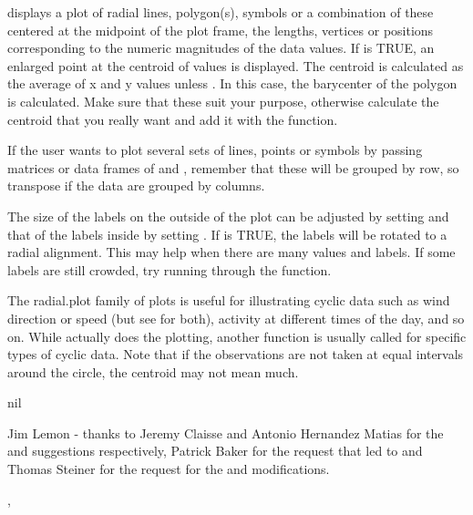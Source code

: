 \begin{Details}\relax
{} displays a plot of radial lines, polygon(s),
symbols or a combination of these centered at the midpoint of
the plot frame, the lengths, vertices or positions corresponding
to the numeric magnitudes of the data values. If 
is TRUE, an enlarged point at the centroid of values is displayed. The
centroid is calculated as the average of x and y values unless 
. In this case, the barycenter of the polygon is
calculated. Make sure that these suit your purpose, otherwise calculate
the centroid that you really want and add it with the  function.

If the user wants to plot several sets of lines, points or symbols by
passing matrices or data frames of  and ,
remember that these will be grouped by row, so transpose if the data are
grouped by columns.

The size of the labels on the outside of the plot can be adjusted by 
setting  and that of the labels inside by setting
. If  is TRUE, the labels will be rotated
to a radial alignment. This may help when there are many values and labels.
If some labels are still crowded, try running  through the
 function.

The radial.plot family of plots is useful for illustrating
cyclic data such as wind direction or speed (but see 
for both), activity at different times of the day, and so on. While 
 actually does the plotting, another function is usually 
called for specific types of cyclic data. Note that if the observations
are not taken at equal intervals around the circle, the centroid may not
mean much.
\end{Details}
\begin{Value}
nil
\end{Value}
\begin{Author}\relax
Jim Lemon - thanks to Jeremy Claisse and Antonio Hernandez Matias
for the  and  suggestions respectively, Patrick
Baker for the request that led to  and Thomas Steiner for
the request for the  and  modifications.
\end{Author}
\begin{SeeAlso}\relax
{},
\end{SeeAlso}
